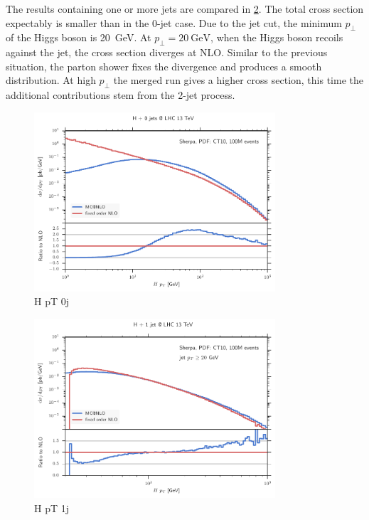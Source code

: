 The results containing one or more jets are compared in \cref{fig:hj_hpt_nominal}.
The total cross section expectably is smaller than in the 0-jet case.
Due to the jet cut, the minimum $p_\perp$ of the Higgs boson is \SI{20}{\giga\electronvolt}.
At $p_\perp = \SI{20}{\giga\electronvolt}$, when the Higgs boson recoils against the jet, the cross section diverges at NLO.
Similar to the previous situation, the parton shower fixes the divergence and produces a smooth distribution.
At high $p_\perp$ the merged run gives a higher cross section, this time the additional contributions stem from the 2-jet process.
%
\begin{figure}
	\centering
	\includegraphics[width=0.8\textwidth]{images/h_hpt_nominal.pdf}
	\caption{H pT 0j}
	\label{fig:h_hpt_nominal}
\end{figure}
%
\begin{figure}
	\centering
	\includegraphics[width=0.8\textwidth]{images/hj_hpt_nominal.pdf}
	\caption{H pT 1j}
	\label{fig:hj_hpt_nominal}
\end{figure}
%
